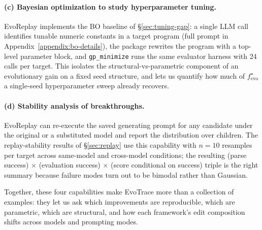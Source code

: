 \paragraph{(c) Bayesian optimization to study hyperparameter tuning.}
EvoReplay implements the BO baseline of \S\ref{sec:tuning-gap}: a single LLM call identifies tunable numeric constants in a target program (full prompt in Appendix~\ref{appendix:bo-details}), the package rewrites the program with a top-level parameter block, and \texttt{gp\_minimize} runs the same evaluator harness with 24 calls per target. This isolates the structural-vs-parametric component of an evolutionary gain on a fixed seed structure, and lets us quantify how much of $f^{\star}_{\mathrm{evo}}$ a single-seed hyperparameter sweep already recovers.

\paragraph{(d) Stability analysis of breakthroughs.}
EvoReplay can re-execute the saved generating prompt for any candidate under the original or a substituted model and report the distribution over children. The replay-stability results of \S\ref{sec:replay} use this capability with $n{=}10$ resamples per target across same-model and cross-model conditions; the resulting (parse success) $\times$ (evaluation success) $\times$ (score conditional on success) triple is the right summary because failure modes turn out to be bimodal rather than Gaussian.

Together, these four capabilities make EvoTrace more than a collection of examples: they let us ask which improvements are reproducible, which are parametric, which are structural, and how each framework's edit composition shifts across models and prompting modes.
